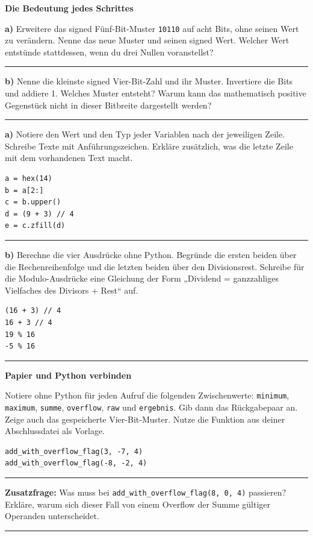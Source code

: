 \documentclass[10pt,a4paper]{article}
\newcommand{\titlepagepart}[2]{\vspace*{-4mm}{\sffamily\small #1}\par{\sffamily\LARGE\bfseries #2}\par\vspace{2mm}}
\newcommand{\block}[1]{\par\vspace{2mm}{\sffamily\large\bfseries #1}\par}
\newcommand{\code}[1]{\texttt{#1}}
\newcommand{\antwort}[1]{\par\vspace{#1}\hrule\vspace{3mm}}
\begin{document}
\newpage
\titlepagepart{03 / GRENZFÄLLE UND PYTHON · CA. 15 MINUTEN}{Die Bedeutung jedes Schrittes}
\block{5. Zwei Darstellungsgrenzen}
\textbf{a)} Erweitere das signed Fünf-Bit-Muster \code{10110} auf acht Bits,
ohne seinen Wert zu verändern. Nenne das neue Muster und seinen signed Wert.
Welcher Wert entstünde stattdessen, wenn du drei Nullen voranstellst?
\antwort{24mm}
\textbf{b)} Nenne die kleinste signed Vier-Bit-Zahl und ihr Muster. Invertiere
die Bits und addiere 1. Welches Muster entsteht? Warum kann das mathematisch
positive Gegenstück nicht in dieser Bitbreite dargestellt werden?
\antwort{25mm}

\block{6. Textbearbeitung und Reste}
\textbf{a)} Notiere den Wert und den Typ jeder Variablen nach der jeweiligen
Zeile. Schreibe Texte mit Anführungszeichen. Erkläre zusätzlich, was die letzte
Zeile mit dem vorhandenen Text macht.
\begin{lstlisting}
a = hex(14)
b = a[2:]
c = b.upper()
d = (9 + 3) // 4
e = c.zfill(d)
\end{lstlisting}
\antwort{23mm}
\textbf{b)} Berechne die vier Ausdrücke ohne Python. Begründe die ersten beiden
über die Rechenreihenfolge und die letzten beiden über den Divisionsrest.
Schreibe für die Modulo-Ausdrücke eine Gleichung der Form
„Dividend = ganzzahliges Vielfaches des Divisors + Rest“ auf.
\begin{lstlisting}
(16 + 3) // 4
16 + 3 // 4
19 % 16
-5 % 16
\end{lstlisting}
\antwort{28mm}

\newpage
\titlepagepart{04 / TRANSFER UND KONTROLLE · CA. 13 MINUTEN}{Papier und Python verbinden}
\block{7. Die Funktion gedanklich ausführen}
Notiere ohne Python für jeden Aufruf die folgenden Zwischenwerte: \code{minimum},
\code{maximum}, \code{summe}, \code{overflow}, \code{raw} und
\code{ergebnis}. Gib dann das Rückgabepaar an. Zeige auch das gespeicherte
Vier-Bit-Muster. Nutze die Funktion aus deiner Abschlussdatei als Vorlage.
\begin{lstlisting}
add_with_overflow_flag(3, -7, 4)
add_with_overflow_flag(-8, -2, 4)
\end{lstlisting}
\antwort{34mm}
\textbf{Zusatzfrage:} Was muss bei \code{add\_with\_overflow\_flag(8, 0, 4)}
passieren? Erkläre, warum sich dieser Fall von einem Overflow der Summe gültiger
Operanden unterscheidet.
\antwort{18mm}
\end{document}
